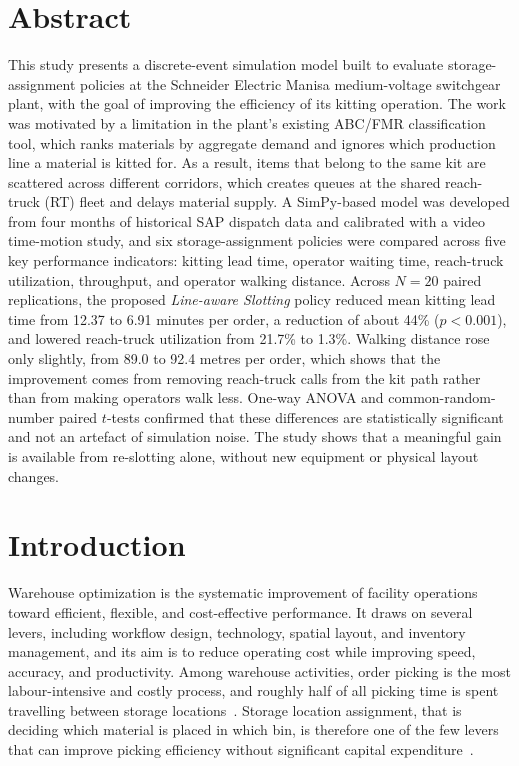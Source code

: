 \documentclass[12pt,a4paper]{article}
\newcommand{\policy}[1]{\textit{#1}}
\begin{document}
\section*{Abstract}
This study presents a discrete-event simulation model built to evaluate
storage-assignment policies at the Schneider Electric Manisa medium-voltage
switchgear plant, with the goal of improving the efficiency of its kitting
operation. The work was motivated by a limitation in the plant's existing
ABC/FMR classification tool, which ranks materials by aggregate demand and
ignores which production line a material is kitted for. As a result, items
that belong to the same kit are scattered across different corridors, which
creates queues at the shared reach-truck (RT) fleet and delays material
supply. A SimPy-based model was developed from four months of historical SAP
dispatch data and calibrated with a video time-motion study, and six
storage-assignment policies were compared across five key performance
indicators: kitting lead time, operator waiting time, reach-truck
utilization, throughput, and operator walking distance. Across $N=20$ paired
replications, the proposed \policy{Line-aware Slotting} policy reduced mean
kitting lead time from 12.37 to 6.91 minutes per order, a reduction of about
44\% ($p<0.001$), and lowered reach-truck utilization from 21.7\% to 1.3\%.
Walking distance rose only slightly, from 89.0 to 92.4 metres per order,
which shows that the improvement comes from removing reach-truck calls from
the kit path rather than from making operators walk less. One-way ANOVA and
common-random-number paired $t$-tests confirmed that these differences are
statistically significant and not an artefact of simulation noise. The study
shows that a meaningful gain is available from re-slotting alone, without new
equipment or physical layout changes.

\section{Introduction}
Warehouse optimization is the systematic improvement of facility operations
toward efficient, flexible, and cost-effective performance. It draws on
several levers, including workflow design, technology, spatial layout, and
inventory management, and its aim is to reduce operating cost while improving
speed, accuracy, and productivity. Among warehouse activities, order picking
is the most labour-intensive and costly process, and roughly half of all
picking time is spent travelling between storage locations~\cite{frazelle2002}.
Storage location assignment, that is deciding which material is placed in
which bin, is therefore one of the few levers that can improve picking
efficiency without significant capital expenditure~\cite{dekoster2007}.
\end{document}
